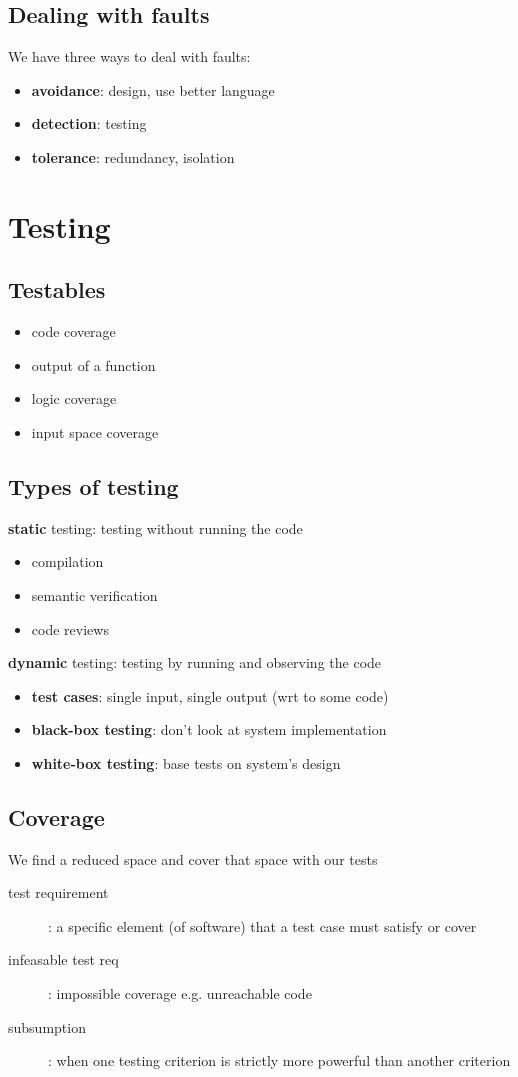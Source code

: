\documentclass[]{article}
\theoremstyle{definition}
\begin{document}
		\subsection{Dealing with faults}
			We have three ways to deal with faults:
			\begin{itemize}
				\item \textbf{avoidance}: design, use better language
				\item \textbf{detection}: testing
				\item \textbf{tolerance}: redundancy, isolation
			\end{itemize}								
	\section{Testing}
		\subsection{Testables}
			\begin{itemize}
				\item code coverage
				\item output of a function
				\item logic coverage
				\item input space coverage
			\end{itemize}
		\subsection{Types of testing}
			\textbf{static} testing: testing without running the code
			\begin{itemize}
				\item compilation
				\item semantic verification
				\item code reviews
			\end{itemize}
			\textbf{dynamic} testing: testing by running and observing the code
			\begin{itemize}
				\item \textbf{test cases}: single input, single output (wrt to some code)
				\item \textbf{black-box testing}: don't look at system implementation
				\item \textbf{white-box testing}: base tests on system's design
			\end{itemize}
		\subsection{Coverage}
			We find a reduced space and cover that space with our tests
			\begin{description}
				\item[test requirement]: a specific element (of software) that a test case must satisfy or cover
				\item[infeasable test req]: impossible coverage e.g. unreachable code
				\item[subsumption]: when one testing criterion is strictly more powerful than another criterion
			\end{description}
			
\end{document}
